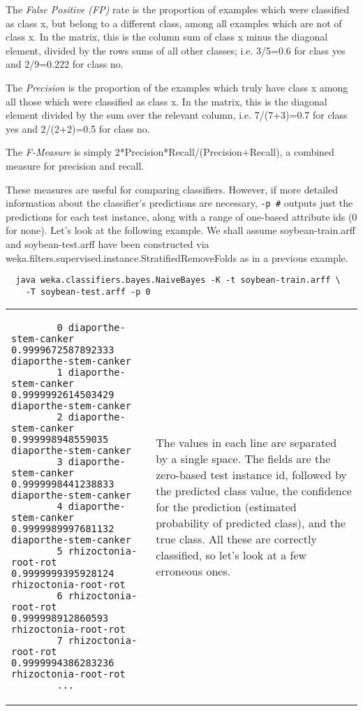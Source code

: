 The \textit{False Positive (FP)} rate is the proportion of examples which were classified as class x, but belong to a different class, among all examples which are not of class x. In the matrix, this is the column sum of class x minus the diagonal element, divided by the rows sums of all other classes; i.e. 3/5=0.6 for class yes and 2/9=0.222 for class no.

The \textit{Precision} is the proportion of the examples which truly have class x among all those which were classified as class x. In the matrix, this is the diagonal element divided by the sum over the relevant column, i.e. 7/(7+3)=0.7 for class yes and 2/(2+2)=0.5 for class no.

The \textit{F-Measure} is simply 2*Precision*Recall/(Precision+Recall), a combined measure for precision and recall.

These measures are useful for comparing classifiers. However, if more detailed information about the classifier's predictions are necessary, \texttt{-p \#} outputs just the predictions for each test instance, along with a range of one-based attribute ids (0 for none). Let's look at the following example. We shall assume soybean-train.arff and soybean-test.arff have been constructed via weka.filters.supervised.instance.StratifiedRemoveFolds as in a previous example.

{\scriptsize
\begin{verbatim}
  java weka.classifiers.bayes.NaiveBayes -K -t soybean-train.arff \
    -T soybean-test.arff -p 0
\end{verbatim}}

\vspace{0.5cm}
\noindent
\begin{tabular}{l l}
	\begin{minipage}{8cm}
		{\scriptsize
		\begin{verbatim}
		0 diaporthe-stem-canker 0.9999672587892333 diaporthe-stem-canker
		1 diaporthe-stem-canker 0.9999992614503429 diaporthe-stem-canker
		2 diaporthe-stem-canker 0.999998948559035 diaporthe-stem-canker
		3 diaporthe-stem-canker 0.9999998441238833 diaporthe-stem-canker
		4 diaporthe-stem-canker 0.9999989997681132 diaporthe-stem-canker
		5 rhizoctonia-root-rot 0.9999999395928124 rhizoctonia-root-rot
		6 rhizoctonia-root-rot 0.999998912860593 rhizoctonia-root-rot
		7 rhizoctonia-root-rot 0.9999994386283236 rhizoctonia-root-rot
		...
		\end{verbatim}}
	\end{minipage}
	&
	\begin{minipage}{5cm}
	The values in each line are separated by a single space. The fields are the zero-based test instance id, followed by the predicted class value, the confidence for the prediction (estimated probability of predicted class), and the true class. All these are correctly classified, so let's look at a few erroneous ones.
	\end{minipage}
	\\
\end{tabular}

